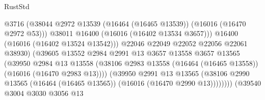 \begin{lexlean}{RustStd}
\begin{coremodule}
                                              @3716
                                              (@38044
                                                @2972
                                                @13539
                                                (@16464 (@16465 @13539))
                                                (@16016 (@16470 @2972 @53)))
                                              @38011
                                              @16400
                                              (@16016 (@16402 @13534 @3657)))
                                            @16400
                                            (@16016 (@16402 @13524 @13542)))
                                          @22046
                                          @22049
                                          @22052
                                          @22056
                                          @22061
                                          @38930)
                                        (@39605
                                          @13552
                                          @2984
                                          @2991
                                          @13
                                          @3657
                                          @13558
                                          @3657
                                          @13565
                                          (@39950
                                            @2984
                                            @13
                                            @13558
                                            (@38106
                                              @2983
                                              @13558
                                              (@16464 (@16465 @13558))
                                              (@16016 (@16470 @2983 @13))))
                                          (@39950
                                            @2991
                                            @13
                                            @13565
                                            (@38106
                                              @2990
                                              @13565
                                              (@16464 (@16465 @13565))
                                              (@16016 (@16470 @2990 @13))))))))
                                  (@39540
                                    @3004
                                    @3030
                                    @3056
                                    @13

\end{coremodule}
\end{lexlean}
